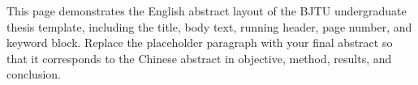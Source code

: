 \begin{enabstract}
This page demonstrates the English abstract layout of the BJTU undergraduate thesis template, including the title, body text, running header, page number, and keyword block. Replace the placeholder paragraph with your final abstract so that it corresponds to the Chinese abstract in objective, method, results, and conclusion.

\placeholderpar

\end{enabstract}
